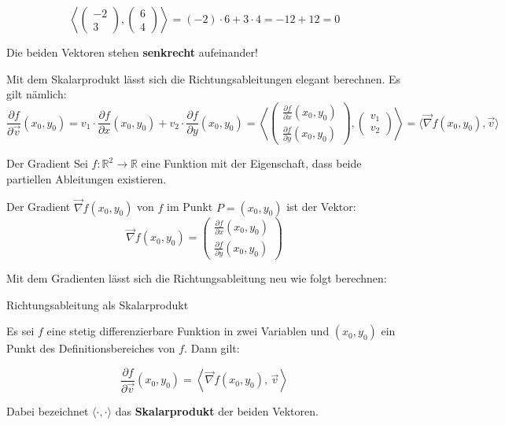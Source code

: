 \begin{bsp}
	{}{}
	\[
		\left\langle
		\begin{pmatrix} -2 \\ 3 \end{pmatrix},
		\begin{pmatrix} 6 \\ 4 \end{pmatrix}
		\right\rangle
		= (-2) \cdot 6 + 3 \cdot 4 = -12 + 12 = 0
	\]

	Die beiden Vektoren stehen  \textbf{senkrecht} aufeinander!

\end{bsp}

Mit dem Skalarprodukt lässt sich die Richtungsableitungen elegant berechnen. Es gilt nämlich:
\[
	\frac{\partial f}{\partial \vec{v}}(x_0, y_0)=
	v_1 \cdot \frac{\partial f}{\partial x}(x_0, y_0)
	+ v_2 \cdot \frac{\partial f}{\partial y}(x_0, y_0)
	= \left\langle \begin{pmatrix}
		\frac{\partial f}{\partial x}(x_0, y_0) \\
		\frac{\partial f}{\partial y}(x_0, y_0)
	\end{pmatrix}
	,
	\begin{pmatrix}
		v_1 \\v_2
	\end{pmatrix}
	\right\rangle
	=\langle \vec{\nabla} f(x_0, y_0), \vec{v} \rangle
\]

\begin{definition}
	{Der Gradient}{}
	Sei \( f \colon \mathbb{R}^2 \to \mathbb{R} \) eine Funktion mit der Eigenschaft, dass beide partiellen Ableitungen existieren.

	Der Gradient \( \vec{\nabla} f(x_0, y_0) \) von \( f \) im Punkt \( P = (x_0, y_0) \) ist der Vektor:
	\[
		\vec{\nabla} f(x_0, y_0) =
		\begin{pmatrix}
			\frac{\partial f}{\partial x}(x_0, y_0) \\
			\frac{\partial f}{\partial y}(x_0, y_0)
		\end{pmatrix}
	\]

\end{definition}

Mit dem Gradienten lässt sich die Richtungsableitung neu wie folgt berechnen:
\begin{satz}
	{Richtungsableitung als Skalarprodukt}{}

	Es sei \( f \) eine stetig differenzierbare Funktion in zwei Variablen und
	\( (x_0, y_0) \) ein Punkt des Definitionsbereiches von \( f \). Dann gilt:

	\[
		\frac{\partial f}{\partial \vec{v}}(x_0, y_0) = \left\langle \vec{\nabla} f(x_0, y_0),\, \vec{v} \right\rangle
	\]

	Dabei bezeichnet \( \langle \cdot, \cdot \rangle \) das \textbf{Skalarprodukt} der beiden Vektoren.

\end{satz}

